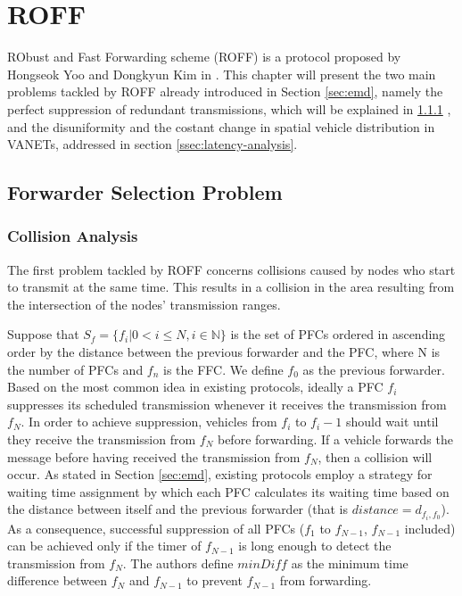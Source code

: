 
\chapter{ROFF}
	\label{chapter:roff}

	RObust and Fast Forwarding scheme (ROFF) is a protocol proposed by Hongseok Yoo and Dongkyun Kim in \cite{6906275}. This chapter will present the two main problems tackled by ROFF already introduced in Section \ref{sec:emd}, namely the perfect suppression of redundant transmissions, which will be explained in \ref{ssec:collision-analysis} , and the disuniformity and the costant change in spatial vehicle distribution in VANETs, addressed in section \ref{ssec:latency-analysis}.

	\section{Forwarder Selection Problem}
		\subsection{Collision Analysis}
			\label{ssec:collision-analysis}
			The first problem tackled by ROFF concerns collisions caused by nodes who start to transmit at the same time. This results in a collision in the area resulting from the intersection of the nodes' transmission ranges.
			
			
			Suppose that $S_f=\{f_i | 0 < i \leq N, i \in \mathbb{N} \}$ is the set of PFCs ordered in ascending order by the distance between the previous forwarder and the PFC, where N is the number of PFCs and $f_n$ is the FFC. We define $f_0$ as the previous forwarder.
			Based on the most common idea in existing protocols, ideally a PFC $f_i$ suppresses its scheduled transmission whenever it receives the transmission from $f_N$. In order to achieve suppression, vehicles from $f_i$ to $f_i-1$ should wait until they receive the transmission from $f_N$ before forwarding. If a vehicle forwards the message before having received the transmission from $f_N$, then a collision will occur. As stated in Section \ref{sec:emd}, existing protocols employ a strategy for waiting time assignment by which each PFC calculates its waiting time based on the distance between itself and the previous forwarder (that is $distance = d_{f_i, f_0}$). As a consequence, successful suppression of all PFCs ($f_1$ to $f_{N-1}$, $f_{N-1}$ included) can be achieved only if the timer of $f_{N-1}$ is long enough to detect the transmission from $f_N$. The authors define $minDiff$ as the minimum time difference between $f_N$ and $f_{N-1}$ to prevent $f_{N-1}$ from forwarding.
			
